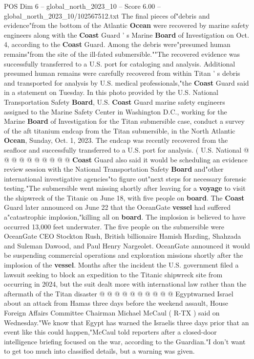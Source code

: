 \begin{textsample}{POS Dim 6 – global\_north\_2023\_10 – Score 6.00 – global\_north\_2023\_10/102567512.txt}  \label{ex:f6_pos_205}
The final pieces of"debris and evidence"from the bottom of the Atlantic \textbf{Ocean} were recovered by marine safety engineers along with the \textbf{Coast} Guard ' s Marine \textbf{Board} of Investigation on Oct. 4, according to the \textbf{Coast} Guard.
Among the debris were"presumed human remains"from the site of the ill-fated submersible.""The recovered evidence was successfully transferred to a U.S. port for cataloging and analysis.
Additional presumed human remains were carefully recovered from within Titan ' s debris and transported for analysis by U.S. medical professionals,"the \textbf{Coast} Guard said in a statement on Tuesday.
In this photo provided by the U.S.
National Transportation Safety \textbf{Board}, U.S. \textbf{Coast} Guard marine safety engineers assigned to the Marine Safety Center in Washington D.C., working for the Marine \textbf{Board} of Investigation for the Titan submersible case, conduct a survey of the aft titanium endcap from the Titan submersible, in the North Atlantic \textbf{Ocean}, Sunday, Oct. 1, 2023.
The endcap was recently recovered from the seafloor and successfully transferred to a U.S. port for analysis. ( U.S.
National @ @ @ @ @ @ @ @ @ @ \textbf{Coast} Guard also said it would be scheduling an evidence review session with the National Transportation Safety \textbf{Board} and"other international investigative agencies"to figure out"next steps for necessary forensic testing."The submersible went missing shortly after leaving for a \textbf{voyage} to visit the shipwreck of the Titanic on June 18, with five people on \textbf{board}.
The \textbf{Coast} Guard later announced on June 22 that the OceanGate \textbf{vessel} had suffered a"catastrophic implosion,"killing all on \textbf{board}.
The implosion is believed to have occurred 13,000 feet underwater.
The five people on the submersible were OceanGate CEO Stockton Rush, British billionaire Hamish Harding, Shahzada and Suleman Dawood, and Paul Henry Nargeolet.
OceanGate announced it would be suspending commercial operations and exploration missions shortly after the implosion of the \textbf{vessel}.
Months after the incident the U.S. government filed a lawsuit seeking to block an expedition to the Titanic shipwreck site from occurring in 2024, but the suit dealt more with international law rather than the aftermath of the Titan disaster @ @ @ @ @ @ @ @ @ @ Egyptwarned Israel about an attack from Hamas three days before the weekend assault, House Foreign Affairs Committee Chairman Michael McCaul ( R-TX ) said on Wednesday."We know that Egypt has warned the Israelis three days prior that an event like this could happen,"McCaul told reporters after a closed-door intelligence briefing focused on the war, according to the Guardian."I don't want to get too much into classified details, but a warning was given.

\end{textsample}
